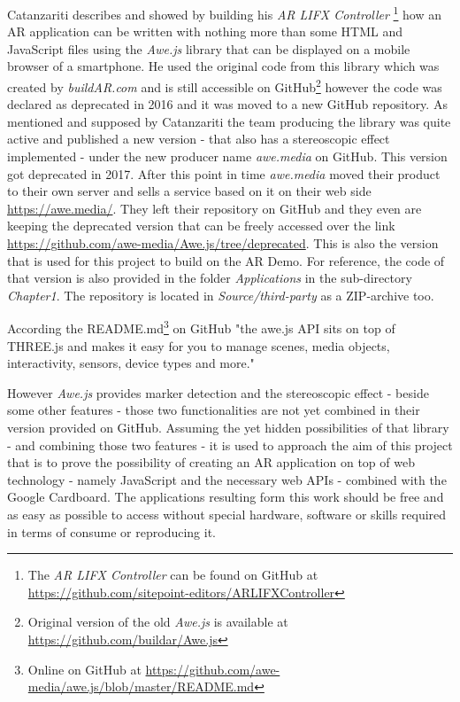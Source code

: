 Catanzariti describes and showed by building his  \textit{AR LIFX Controller} \footnote{The \textit{AR LIFX Controller} can be found on GitHub at \url{https://github.com/sitepoint-editors/ARLIFXController}} how an AR application can be written with nothing more than some HTML and JavaScript files using the \textit{Awe.js} library that can be displayed on a mobile browser of a smartphone. He used the original code from this library which was created by \textit{buildAR.com} and is still accessible on GitHub\footnote{Original version of the old \textit{Awe.js} is available at \url{https://github.com/buildar/Awe.js}} however the code was declared as deprecated in 2016 and it was moved to a new GitHub repository. As mentioned and supposed by Catanzariti the team producing the library was quite active and published a new version - that also has a stereoscopic effect implemented - under the new producer name \textit{awe.media} on GitHub. This version got deprecated in 2017. After this point in time \textit{awe.media} moved their product to their own server and sells a service based on it on their web side \url{https://awe.media/}. 
They left their repository on GitHub and they even are keeping the deprecated version that can be freely accessed over the link \url{https://github.com/awe-media/Awe.js/tree/deprecated}. This is also the version that is used for this project to build on the AR Demo. For reference, the code of that version is also provided in the folder \textit{Applications} in the sub-directory \textit{Chapter1}. The repository is located in \textit{Source/third-party} as a ZIP-archive too. 

According the README.md\footnote{Online on GitHub at \url{https://github.com/awe-media/awe.js/blob/master/README.md}} on GitHub "the awe.js API sits on top of THREE.js and makes it easy for you to manage scenes, media objects, interactivity, sensors, device types and more."

However \textit{Awe.js} provides marker detection and the stereoscopic effect - beside some other features - those two functionalities are not yet combined in their version provided on GitHub. Assuming the yet hidden possibilities of that library - and combining those two features - it is used to approach the aim of this project that is to prove the possibility of creating an AR application on top of web technology - namely JavaScript and the necessary web APIs - combined with the Google Cardboard. The applications resulting form this work should be free and as easy as possible to access without special hardware, software or skills required in terms of consume or reproducing it.


